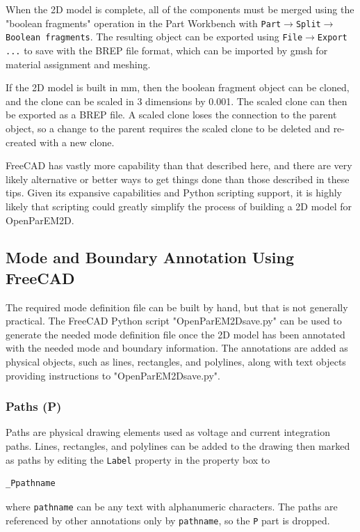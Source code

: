 \documentclass[titlepage]{article}
\renewcommand\_{\textunderscore\linebreak[1]}
\begin{document}
When the 2D model is complete, all of the components must be merged using the "boolean fragments" operation in the Part Workbench with \texttt{Part}$\rightarrow$\texttt{Split}$\rightarrow$\texttt{Boolean fragments}.  The resulting object can be exported using \texttt{File}$\rightarrow$\texttt{Export ...} to save with the BREP file format, which can be imported by gmsh for material assignment and meshing. 

If the 2D model is built in mm, then the boolean fragment object can be cloned, and the clone can be scaled in 3 dimensions by 0.001.  The scaled clone can then be exported as a BREP file.  A scaled clone loses the connection to the parent object, so a change to the parent requires the scaled clone to be deleted and re-created with a new clone.

FreeCAD has vastly more capability than that described here, and there are very likely alternative or better ways to get things done than those described in these tips.  Given its expansive capabilities and Python scripting support, it is highly likely that scripting could greatly simplify the process of building a 2D model for OpenParEM2D.

\subsection{Mode and Boundary Annotation Using FreeCAD}

The required mode definition file can be built by hand, but that is not generally practical.  The FreeCAD Python script "OpenParEM2D\_save.py" can be used to generate the needed mode definition file once the 2D model has been annotated with the needed mode and boundary information.  The annotations are added as physical objects, such as lines, rectangles, and polylines, along with text objects providing instructions to "OpenParEM2D\_save.py". 

\subsubsection{Paths (\_P)}
\label{sec:paths}

Paths are physical drawing elements used as voltage and current integration paths.  Lines, rectangles, and polylines can be added to the drawing then marked as paths by editing the \texttt{Label} property in the property box to
\begin{Verbatim}[fontsize=\small]
  _Ppathname
\end{Verbatim}
\noindent where \texttt{pathname} can be any text with alphanumeric characters.  The paths are referenced by other annotations only by \texttt{pathname}, so the \texttt{\_P} part is dropped.
\end{document}
